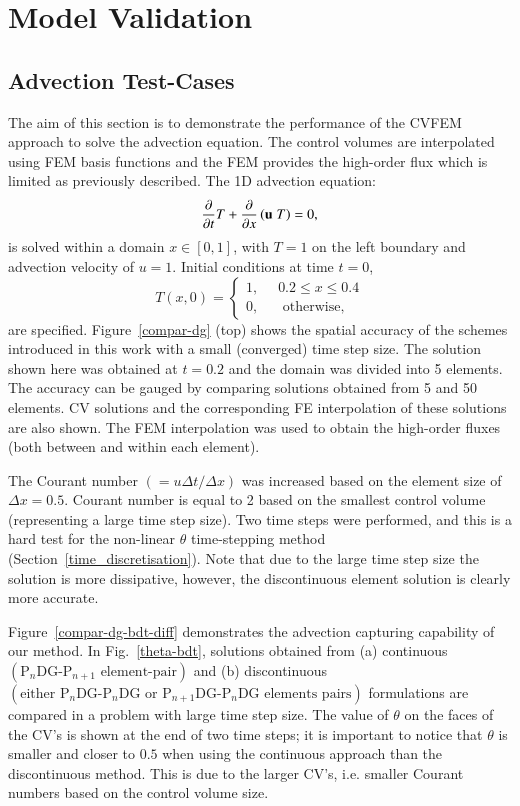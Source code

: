 \documentclass[preprint,authoryear,12pt]{elsarticle}
\begin{document}
\section{Model Validation}\label{Section:Results}%
\subsection{Advection Test-Cases}
The aim of this section is to demonstrate the performance of the CVFEM approach to solve the advection equation. The control volumes are interpolated using FEM basis functions and the FEM provides the high-order flux which is limited as previously described. The 1D advection equation:
\begin{displaymath}
  \displaystyle\frac{\partial}{\partial t} T + \frac{\partial}{\partial x} \left( {\bf u}\;T \right) = 0, 
\end{displaymath}
is solved within a domain $x\in \left[0,1\right]$, with $T=1$ on the left boundary and advection velocity of $u=1$. Initial conditions at time $t=0$,
\begin{displaymath}
  T\left( x,0\right)= \begin{cases} 1, \;\; &  0.2 \le  x \le 0.4 \\
    0, & \mbox{ otherwise,}
  \end{cases}
\end{displaymath}
are specified. Figure~\ref{compar-dg} (top) shows the spatial accuracy of the schemes introduced in this work with a small (converged) time step size. The solution shown here was obtained at $t=0.2$ and the domain was divided into 5 elements. The accuracy can be gauged by comparing solutions obtained from 5 and 50 elements. CV solutions and the corresponding FE interpolation of these solutions are also shown. The FEM interpolation was used to obtain the high-order fluxes (both between and within each element). 

The Courant number $\left(=u\Delta t / \Delta x\right)$ was increased based on the element size of $\Delta x = 0.5$. Courant number is equal to 2 based on the smallest control volume (representing a large time step size). Two time steps were performed, and this is a hard test for the non-linear $\theta$ time-stepping method (Section~\ref{time_discretisation}). Note that due to the large time step size the solution is more dissipative, however, the discontinuous element solution is clearly more accurate. 

Figure~\ref{compar-dg-bdt-diff} demonstrates the advection capturing capability of our method. In Fig.~\ref{theta-bdt}, solutions obtained from (a) continuous $\left(\text{P}_{n}\text{DG-P}_{n+1}\text{ element-pair}\right)$ and (b) discontinuous $\left(\text{either P}_{n}\text{DG-P}_{n}\text{DG  or P}_{n+1}\text{DG-P}_{n}\text{DG elements pairs}\right)$ formulations are compared in a problem with large time step size. The value of $\theta$ on the faces of the CV's is shown at the end of two time steps; it is important to notice that $\theta$ is smaller and closer to $0.5$ when using the continuous approach than the discontinuous method. This is due to the larger CV's, i.e. smaller Courant numbers based on the control volume size.
\end{document}

